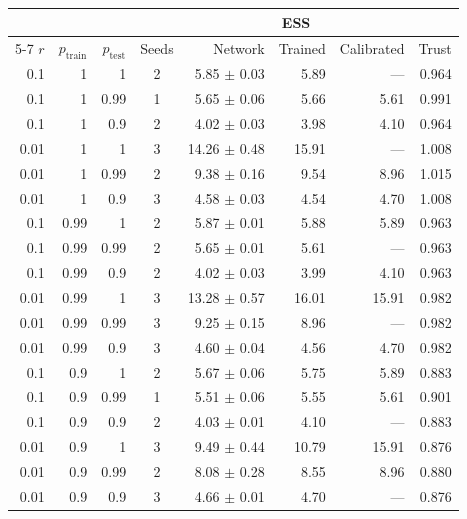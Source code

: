 \begin{tabular}{rrrcrrrr}
\toprule
& & & & \multicolumn{3}{c}{ESS} & \\
\cmidrule(lr){5-7}
$r$ & $p_{\mathrm{train}}$ & $p_{\mathrm{test}}$ & Seeds & Network & Trained & Calibrated & Trust \\
\midrule
0.1 & 1 & 1 & 2 & 5.85 $\pm$ 0.03 & 5.89 & --- & 0.964 \\
0.1 & 1 & 0.99 & 1 & 5.65 $\pm$ 0.06 & 5.66 & 5.61 & 0.991 \\
0.1 & 1 & 0.9 & 2 & 4.02 $\pm$ 0.03 & 3.98 & 4.10 & 0.964 \\
0.01 & 1 & 1 & 3 & 14.26 $\pm$ 0.48 & 15.91 & --- & 1.008 \\
0.01 & 1 & 0.99 & 2 & 9.38 $\pm$ 0.16 & 9.54 & 8.96 & 1.015 \\
0.01 & 1 & 0.9 & 3 & 4.58 $\pm$ 0.03 & 4.54 & 4.70 & 1.008 \\
\midrule
0.1 & 0.99 & 1 & 2 & 5.87 $\pm$ 0.01 & 5.88 & 5.89 & 0.963 \\
0.1 & 0.99 & 0.99 & 2 & 5.65 $\pm$ 0.01 & 5.61 & --- & 0.963 \\
0.1 & 0.99 & 0.9 & 2 & 4.02 $\pm$ 0.03 & 3.99 & 4.10 & 0.963 \\
0.01 & 0.99 & 1 & 3 & 13.28 $\pm$ 0.57 & 16.01 & 15.91 & 0.982 \\
0.01 & 0.99 & 0.99 & 3 & 9.25 $\pm$ 0.15 & 8.96 & --- & 0.982 \\
0.01 & 0.99 & 0.9 & 3 & 4.60 $\pm$ 0.04 & 4.56 & 4.70 & 0.982 \\
\midrule
0.1 & 0.9 & 1 & 2 & 5.67 $\pm$ 0.06 & 5.75 & 5.89 & 0.883 \\
0.1 & 0.9 & 0.99 & 1 & 5.51 $\pm$ 0.06 & 5.55 & 5.61 & 0.901 \\
0.1 & 0.9 & 0.9 & 2 & 4.03 $\pm$ 0.01 & 4.10 & --- & 0.883 \\
0.01 & 0.9 & 1 & 3 & 9.49 $\pm$ 0.44 & 10.79 & 15.91 & 0.876 \\
0.01 & 0.9 & 0.99 & 2 & 8.08 $\pm$ 0.28 & 8.55 & 8.96 & 0.880 \\
0.01 & 0.9 & 0.9 & 3 & 4.66 $\pm$ 0.01 & 4.70 & --- & 0.876 \\
\bottomrule
\end{tabular}

